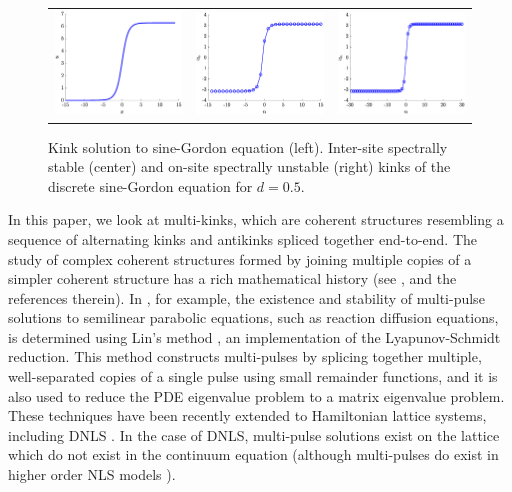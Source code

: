 \documentclass[12pt,reqno]{amsart}
\begin{document}
\begin{figure}[H]
	\begin{center}
	\begin{tabular}{ccc}
	\includegraphics[width=5cm]{contSGkink.eps}	&
	\includegraphics[width=5cm]{1kinkintersite.eps} &
	\includegraphics[width=5cm]{1kinkonsite.eps}
	\end{tabular}
	\end{center}
	\caption{Kink solution to sine-Gordon equation (left). Inter-site spectrally stable (center) and on-site 
	spectrally unstable (right) kinks of the discrete sine-Gordon equation for $d = 0.5$. }
	\label{fig:SGkinks}
\end{figure}


In this paper, we look at multi-kinks, which are coherent structures resembling a sequence of alternating kinks and antikinks spliced together end-to-end. 
The study of complex coherent structures formed by joining multiple copies of a simpler coherent structure has a rich mathematical history (see \cite{Sandstede1998}, and the references therein). In \cite{Sandstede1998}, for example, the existence and stability of multi-pulse solutions to semilinear parabolic equations, such as reaction diffusion equations, is determined using Lin's method \cites{Lin1990,Lin2008}, an implementation of the Lyapunov-Schmidt reduction. This method constructs multi-pulses by splicing together multiple, well-separated copies of a single pulse using small remainder functions, and it is also used to reduce the PDE eigenvalue problem to a matrix eigenvalue problem. These techniques have been recently extended to Hamiltonian lattice systems, including DNLS \cite{Parker2020}. In the case of DNLS, multi-pulse solutions exist on the lattice which do not exist in the continuum equation (although multi-pulses do exist in higher order NLS models \cite{Parker2021}). 
\end{document}
